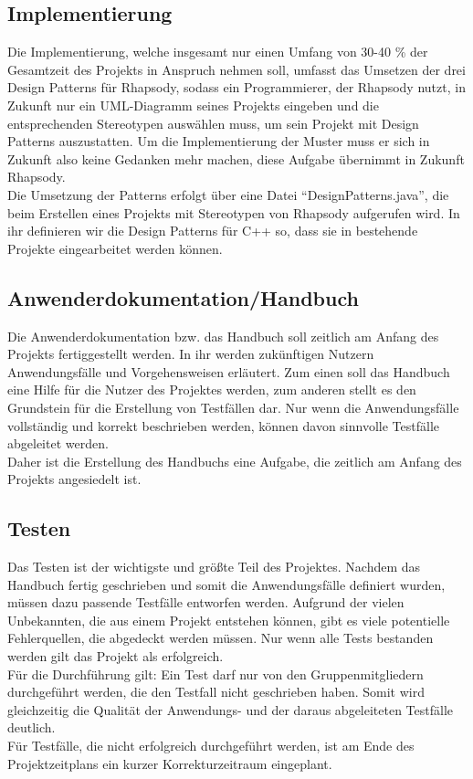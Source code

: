 \subsection{Implementierung}

Die Implementierung, welche insgesamt nur einen Umfang von 30-40 \% der Gesamtzeit des Projekts in Anspruch nehmen soll, umfasst das Umsetzen der drei Design Patterns für Rhapsody, sodass ein Programmierer, der Rhapsody nutzt, in Zukunft nur ein UML-Diagramm seines Projekts eingeben und die entsprechenden Stereotypen auswählen muss, um sein Projekt mit Design Patterns auszustatten. Um die Implementierung der Muster muss er sich in Zukunft also keine Gedanken mehr machen, diese Aufgabe übernimmt in Zukunft Rhapsody.\\
Die Umsetzung der Patterns erfolgt über eine Datei “DesignPatterns.java”, die beim Erstellen eines Projekts mit Stereotypen von Rhapsody aufgerufen wird. In ihr definieren wir die Design Patterns für C++ so, dass sie in bestehende Projekte eingearbeitet werden können.

\subsection{Anwenderdokumentation/Handbuch}

Die Anwenderdokumentation bzw. das Handbuch soll zeitlich am Anfang des Projekts fertiggestellt werden. In ihr werden zukünftigen Nutzern Anwendungsfälle und Vorgehensweisen erläutert. Zum einen soll das Handbuch eine Hilfe für die Nutzer des Projektes werden, zum anderen stellt es den Grundstein für die Erstellung von Testfällen dar. Nur wenn die Anwendungsfälle vollständig und korrekt beschrieben werden, können davon sinnvolle Testfälle abgeleitet werden.\\
Daher ist die Erstellung des Handbuchs eine Aufgabe, die zeitlich am Anfang des Projekts angesiedelt ist.

\subsection{Testen}

Das Testen ist der wichtigste und größte Teil des Projektes. Nachdem das Handbuch fertig geschrieben und somit die Anwendungsfälle definiert wurden, müssen dazu passende Testfälle entworfen werden. Aufgrund der vielen Unbekannten, die aus einem Projekt entstehen können, gibt es viele potentielle Fehlerquellen, die abgedeckt werden müssen. Nur wenn alle Tests bestanden werden gilt das Projekt als erfolgreich.\\
Für die Durchführung gilt: Ein Test darf nur von den Gruppenmitgliedern durchgeführt werden, die den Testfall nicht geschrieben haben. Somit wird gleichzeitig die Qualität der Anwendungs- und der daraus abgeleiteten Testfälle deutlich.\\
Für Testfälle, die nicht erfolgreich durchgeführt werden, ist am Ende des Projektzeitplans ein kurzer Korrekturzeitraum eingeplant. 